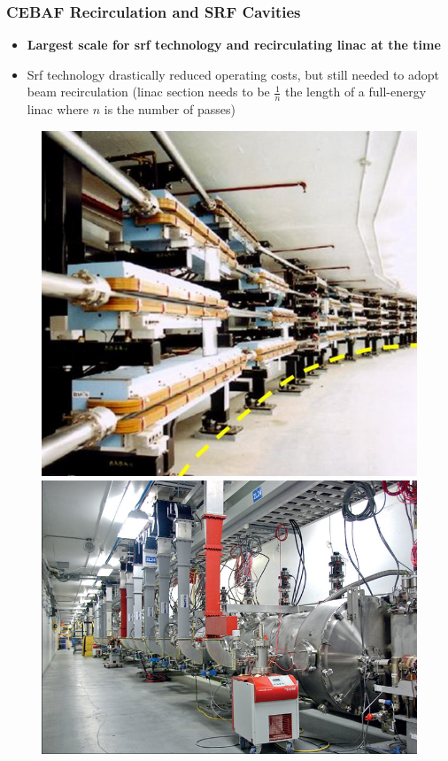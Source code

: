 \documentclass{beamer}
\begin{document}
\begin{frame}
\frametitle{CEBAF Recirculation and SRF Cavities}
\begin{itemize}
\item \textbf{Largest scale for srf technology and recirculating linac at the time}
\item Srf technology drastically reduced operating costs, but still needed to adopt beam recirculation (linac section needs to be $\frac{1}{n}$ the length of a full-energy linac where $n$ is the number of passes)
\end{itemize}
\begin{figure}
\includegraphics[width=0.50\linewidth]{figs/arc.png}
\includegraphics[width=0.60\linewidth]{figs/srf.jpg}
\end{figure}

\end{frame}

\end{document}
